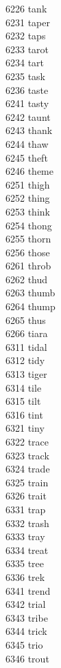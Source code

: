 6226 tank \\
6231 taper \\
6232 taps \\
6233 tarot \\
6234 tart \\
6235 task \\
6236 taste \\
6241 tasty \\
6242 taunt \\
6243 thank \\
6244 thaw \\
6245 theft \\
6246 theme \\
6251 thigh \\
6252 thing \\
6253 think \\
6254 thong \\
6255 thorn \\
6256 those \\
6261 throb \\
6262 thud \\
6263 thumb \\
6264 thump \\
6265 thus \\
6266 tiara \\
6311 tidal \\
6312 tidy \\
6313 tiger \\
6314 tile \\
6315 tilt \\
6316 tint \\
6321 tiny \\
6322 trace \\
6323 track \\
6324 trade \\
6325 train \\
6326 trait \\
6331 trap \\
6332 trash \\
6333 tray \\
6334 treat \\
6335 tree \\
6336 trek \\
6341 trend \\
6342 trial \\
6343 tribe \\
6344 trick \\
6345 trio \\
6346 trout \\
